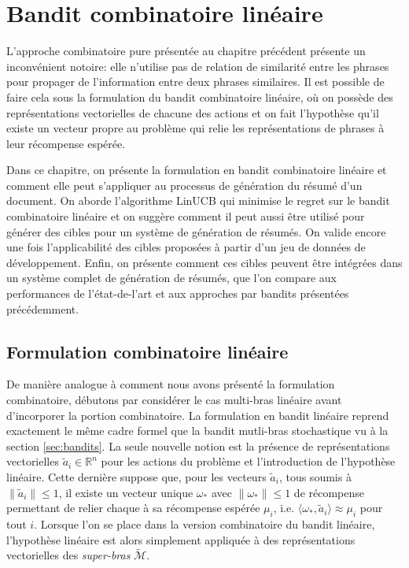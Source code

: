 \chapter{Bandit combinatoire linéaire}
\label{chap:bandit_combi_lin}                   %

L'approche combinatoire pure présentée au chapitre précédent présente un inconvénient
notoire: elle n'utilise pas de relation de similarité entre les phrases pour propager
de l'information entre deux phrases similaires.
Il est possible de faire cela sous la formulation du bandit combinatoire linéaire,
où on possède des représentations vectorielles de chacune des actions et on
fait l'hypothèse qu'il existe un vecteur propre au problème qui relie
les représentations de phrases à leur récompense espérée.

Dans ce chapitre, on présente la formulation en bandit combinatoire linéaire et 
comment elle peut s'appliquer au processus de génération du résumé d'un document.
On aborde l'algorithme LinUCB \citep{chu2011contextual} qui minimise 
le regret sur le bandit combinatoire linéaire et on suggère comment il peut
aussi être utilisé pour générer des cibles pour un système de génération de résumés.
On valide encore une fois l'applicabilité des cibles proposées à partir 
d'un jeu de données de développement.
Enfin, on présente comment ces cibles peuvent être intégrées dans un système complet de
génération de résumés, que l'on compare aux performances de l'état-de-l'art et aux approches par bandits
présentées précédemment.

\section{Formulation combinatoire linéaire}

De manière analogue à comment nous avons présenté la formulation combinatoire,
débutons par considérer le cas multi-bras linéaire avant d'incorporer la portion 
combinatoire.
La formulation en bandit linéaire reprend exactement le même
cadre formel que la bandit mutli-bras stochastique vu à la section \ref{sec:bandits}.
La seule nouvelle notion est la présence de représentations vectorielles $\tilde{a}_i \in \mathbb{R}^n$
pour les actions du problème et l'introduction de l'hypothèse linéaire.
Cette dernière suppose que, pour les vecteurs $\tilde{a}_i$, tous soumis à $\lVert \tilde{a}_i \rVert \leq 1$,
il existe un vecteur unique $\omega_*$ avec $\lVert \omega_* \rVert \leq 1$ de récompense permettant 
de relier chaque à sa récompense espérée $\mu_i$, i.e. 
$\langle \omega_*, \tilde{a}_i\rangle \approx \mu_i$ pour tout $i$.
Lorsque l'on se place dans la version combinatoire du bandit linéaire,
l'hypothèse linéaire est alors simplement appliquée à des représentations vectorielles 
des \textit{super-bras} $\tilde{\mathcal{M}}$.


